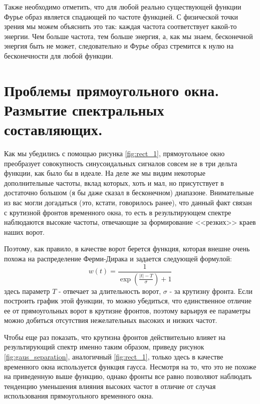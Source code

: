 Также необходимо отметить, что для любой реально существующей функции Фурье образ является спадающей по частоте функцией. С физической точки зрения мы можем объяснить это так: каждая частота соответствует какой-то энергии. Чем больше частота, тем больше энергия, а, как мы знаем, бесконечной энергия быть не может, следовательно и Фурье образ стремится к нулю на бесконечности для любой функции.

\section{Проблемы прямоугольного окна. Размытие спектральных составляющих.}

Как мы убедились с помощью рисунка \ref{fig:rect_1}, прямоугольное окно преобразует совокупность синусоидальных сигналов совсем не в три дельта функции, как было бы в идеале. На деле же мы видим некоторые дополнительные частоты, вклад которых, хоть и мал, но присутствует в достаточно большом (я бы даже сказал в бесконечном) диапазоне. Внимательные из вас могли догадаться (это, кстати, говорилось ранее), что данный факт связан с крутизной фронтов временного окна, то есть в результирующем спектре наблюдаются высокие частоты, отвечающие за формирование <<резких>> краев наших ворот. 

Поэтому, как правило, в качестве ворот берется функция, которая внешне очень похожа на распределение Ферми-Дирака и задается следующей формулой:
\[w(t) = \frac1{\exp\left(\frac{|t| - T}{\sigma}\right) + 1}\]
здесь параметр $T$ - отвечает за длительность ворот, $\sigma$ - за крутизну фронта. Если построить график этой функции, то можно убедиться, что единственное отличие ее от прямоугольных ворот в крутизне фронтов, поэтому варьируя ее параметры можно добиться отсутствия нежелательных высоких и низких частот. 

Чтобы еще раз показать, что крутизна фронтов действительно влияет на результирующий спектр именно таким образом, приведу рисунок \ref{fig:gaus_separation}, аналогичный \ref{fig:rect_1}, только здесь в качестве временного окна используется функция гаусса. Несмотря на то, что это не похоже на приведенную выше функцию, однако фронты все равно позволяют наблюдать тенденцию уменьшения влияния высоких частот в отличие от случая использования прямоугольного временного окна.

